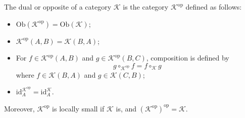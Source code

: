 The dual or opposite of a category $\mathcal{K}$ is the category $\mathcal{K}^{\text{op}}$ defined as follows:

\begin{itemize}
\item $\text{Ob}(\mathcal{K}^{\text{op}}) = \text{Ob}(\mathcal{K})$;
\item $\mathcal{K}^{\text{op}}(A, B) = \mathcal{K}(B, A)$;
\item For $f \in \mathcal{K}^{\text{op}}(A, B)$ and $g \in \mathcal{K}^{\text{op}}(B, C)$, composition is defined by
$$g \circ_{\mathcal{K}^{\text{op}}} f = f \circ_{\mathcal{K}} g$$
where $f \in \mathcal{K}(B, A)$ and $g \in \mathcal{K}(C, B)$;
\item $\text{id}_A^{\mathcal{K}^{\text{op}}} = \text{id}_A^{\mathcal{K}}$.
\end{itemize}

Moreover, $\mathcal{K}^{\text{op}}$ is locally small if $\mathcal{K}$ is, and $(\mathcal{K}^{\text{op}})^{\text{op}} = \mathcal{K}$.
